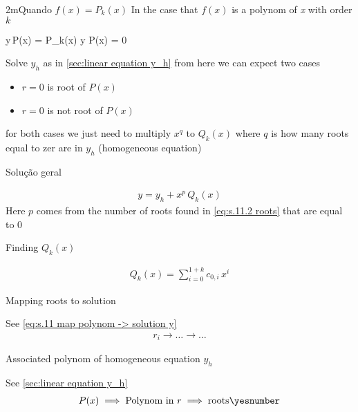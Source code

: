 \documentclass["AM3C-Slides_annotations.tex"]{subfiles}
\begin{document}
\begin{sectionBox}2m{Quando \(f(x)=P_k(x)\)} %
  In the case that \(f(x)\) is a polynom of \textit{x} with order \(k\)
  \begin{BM}
    y\,P(x) = P_k(x)
    \implies
    y\,\,P(x) = 0
  \end{BM}
  Solve \(y_h\) as in \ref{sec:linear equation y_h} from here we can expect two cases
  \begin{itemize}
    \item \(r=0\) is \phantom{not} root of \(P(x)\)
    \item \(r=0\) is not root of \(P(x)\)
  \end{itemize}
  for both cases we just need to multiply \(x^q\) to \(Q_k(x)\) where \(q\) is how many roots equal to zer are in \(y_h\) (homogeneous equation)

  Solução geral
  \begin{tcolorbox}
    \begin{gather*}
      y 
      = y_h 
      + x^p\,Q_k(x)
    \end{gather*}
    Here \(p\) comes from the number of roots found in \eqref{eq:s.11.2 roots} that are equal to 0
  \end{tcolorbox}

  Finding \(Q_k(x)\)
  \begin{tcolorbox}
    \begin{gather*}
      Q_k(x)
      = \sum_{i=0}^{1+k}{
        c_{0,i}\,x^i
      }
    \end{gather*}
  \end{tcolorbox}

  Mapping roots to solution
  \begin{tcolorbox}
    See \ref{eq:s.11 map polynom -> solution y}
    \begin{gather*}
      r_i \to \dots \to \dots
    \end{gather*}
  \end{tcolorbox}

  Associated polynom of homogeneous equation \(y_h\)
  \begin{tcolorbox}
    See \ref{sec:linear equation y_h}
    \begin{gather*}
      P(x)
      \implies \text{Polynom in } r
      \implies \text{roots}
      \yesnumber\label{eq:s.11.2 roots}
    \end{gather*}
  \end{tcolorbox}
\end{sectionBox}
\end{document}
